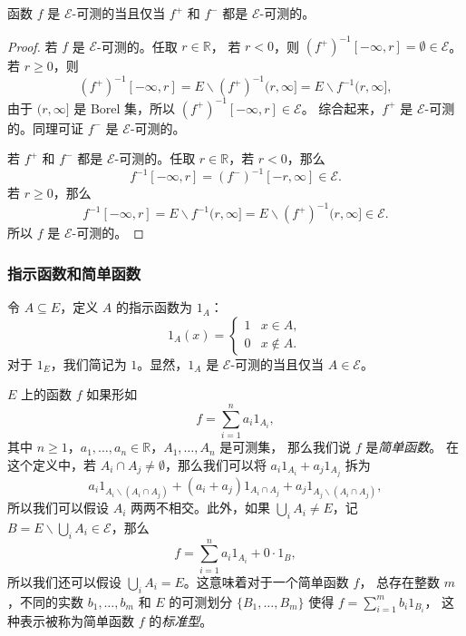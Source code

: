 \documentclass[fontset=none]{Notes}
\begin{document}
\begin{proposition}
  函数 $f$ 是 $\mathcal{E}$-可测的当且仅当 $f^+$ 和 $f^-$
  都是 $\mathcal{E}$-可测的。
\end{proposition}
\begin{proof}
  若 $f$ 是 $\mathcal{E}$-可测的。任取 $r\in \mathbb{R}$，
若 $r< 0$，则 $\left(f^+\right)^{-1}[-\infty,r]=\emptyset\in \mathcal{E}$。
  若 $r\geq 0$，则
  \[
    \left(f^+\right)^{-1}[-\infty,r]=E \smallsetminus \left(f^+\right)^{-1}(r,\infty]
    =E \smallsetminus f^{-1}(r,\infty],
  \]
  由于 $(r,\infty]$ 是 Borel 集，所以 $\left(f^+\right)^{-1}[-\infty,r]\in \mathcal{E}$。
  综合起来，$f^+$ 是 $\mathcal{E}$-可测的。同理可证 $f^-$ 是 $\mathcal{E}$-可测的。

  若 $f^+$ 和 $f^-$ 都是 $\mathcal{E}$-可测的。任取 $r\in \mathbb{R}$，若 $r<0$，那么
  \[
    f^{-1}[-\infty,r]=  \left(f^-\right)^{-1}[-r,\infty]\in \mathcal{E}.
  \]
  若 $r\geq 0$，那么
  \[
    f^{-1}[-\infty,r]= E \smallsetminus f^{-1}(r,\infty]
    =E \smallsetminus \left(f^+\right)^{-1}(r,\infty]\in \mathcal{E}.
  \]
  所以 $f$ 是 $\mathcal{E}$-可测的。
\end{proof}

\subsubsection{指示函数和简单函数}

令 $A\subseteq E$，定义 $A$ 的指示函数为 $1_A$：
\[
  1_A(x)=\begin{cases}
    1 & x\in A,\\
    0 & x\notin A.
  \end{cases}  
\]
对于 $1_E$，我们简记为 $1$。显然，$1_A$ 是 $\mathcal{E}$-可测的当且仅当
$A\in \mathcal{E}$。

$E$ 上的函数 $f$ 如果形如
\[
  f=\sum_{i=1}^n a_i 1_{A_i},  
\]
其中 $n\geq 1$，$a_1,\dots,a_n\in \mathbb{R}$，$A_1,\dots,A_n$ 是可测集，
那么我们说 $f$ 是\emph{简单函数}。
在这个定义中，若 $A_i\cap A_j\ne\emptyset$，那么我们可以将
$a_i1_{A_i}+a_j1_{A_j}$ 拆为
\[ 
  a_i1_{A_i \smallsetminus (A_i\cap A_j)}+(a_i+a_j)1_{A_i\cap A_j}+a_j 1_{A_j \smallsetminus (A_i\cap A_j)},
\]
所以我们可以假设 $A_i$ 两两不相交。此外，如果 $\bigcup_i A_i\neq E$，记
$B=E \smallsetminus\bigcup_i A_i\in \mathcal{E}$，那么
\[
  f=  \sum_{i=1}^n a_i 1_{A_i}+0\cdot 1_{B},
\]
所以我们还可以假设 $\bigcup_i A_i=E$。这意味着对于一个简单函数 $f$，
总存在整数 $m$，不同的实数 $b_1,\dots,b_m$ 和 $E$ 的可测划分
$\{B_1,\dots,B_m\}$ 使得 $f=\sum_{i=1}^m b_i 1_{B_i}$，
这种表示被称为简单函数 $f$ 的\emph{标准型}。
\end{document}
